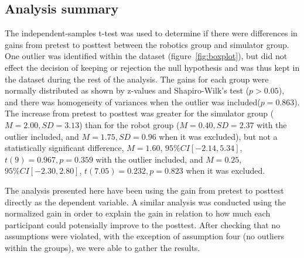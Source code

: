 \subsection*{Analysis summary}
The independent-samples t-test was used to determine if there were differences in gains from pretest to posttest between the robotics group and simulator group. One outlier was identified within the dataset (figure~\ref{fig:boxplot}), but did not effect the decision of keeping or rejection the null hypothesis and was thus kept in the dataset during the rest of the analysis. 
The gains for each group were normally distributed as shown by z-values and Shapiro-Wilk's test ($p > 0.05$), and there was homogeneity of variances when the outlier was included($p = 0.863$). The increase from pretest to posttest was greater for the simulator group ($M = 2.00, SD = 3.13$) than for the robot group ($M = 0.40, SD = 2.37$ with the outlier included, and $M=1.75, SD = 0.96$ when it was excluded), but not a statistically significant difference, $M = 1.60$, $95\% CI [-2.14, 5.34]$, $t(9) = 0.967, p = 0.359$ with the outlier included, and $M = 0.25$, $95\% CI [-2.30, 2.80]$, $t(7.05) = 0.232, p = 0.823$ when it was excluded.

\bigskip\noindent
The analysis presented here have been using the gain from pretest to posttest directly as the dependent variable. A similar analysis was conducted using the normalized gain in order to explain the gain in relation to how much each participant could potensially improve to the posttest. After checking that no assumptions were violated, with the exception of assumption four (no outliers within the groups), we were able to gather the results. 


